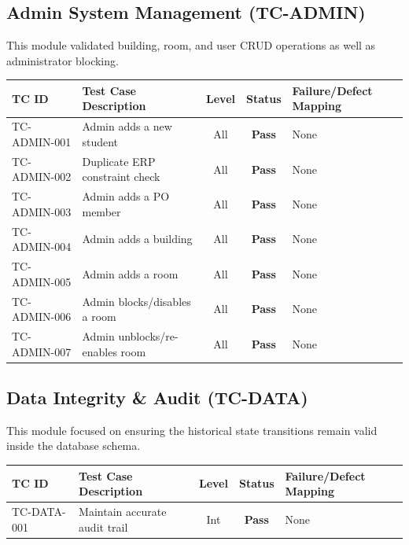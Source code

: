 \documentclass[11pt,a4paper]{article}
\begin{document}
\subsection{Admin System Management (TC-ADMIN)}
This module validated building, room, and user CRUD operations as well as administrator blocking.
\begin{center}
\begin{longtable}{llccp{5.5cm}}
\toprule
\textbf{TC ID} & \textbf{Test Case Description} & \textbf{Level} & \textbf{Status} & \textbf{Failure/Defect Mapping} \\ \midrule
TC-ADMIN-001 & Admin adds a new student & All & \color{passgreenfg}\textbf{Pass} & None \\
TC-ADMIN-002 & Duplicate ERP constraint check & All & \color{passgreenfg}\textbf{Pass} & None \\
TC-ADMIN-003 & Admin adds a PO member & All & \color{passgreenfg}\textbf{Pass} & None \\
TC-ADMIN-004 & Admin adds a building & All & \color{passgreenfg}\textbf{Pass} & None \\
TC-ADMIN-005 & Admin adds a room & All & \color{passgreenfg}\textbf{Pass} & None \\
TC-ADMIN-006 & Admin blocks/disables a room & All & \color{passgreenfg}\textbf{Pass} & None \\
TC-ADMIN-007 & Admin unblocks/re-enables room & All & \color{passgreenfg}\textbf{Pass} & None \\
\bottomrule
\end{longtable}
\end{center}

\subsection{Data Integrity \& Audit (TC-DATA)}
This module focused on ensuring the historical state transitions remain valid inside the database schema.
\begin{center}
\begin{longtable}{llccp{5.5cm}}
\toprule
\textbf{TC ID} & \textbf{Test Case Description} & \textbf{Level} & \textbf{Status} & \textbf{Failure/Defect Mapping} \\ \midrule
TC-DATA-001 & Maintain accurate audit trail & Int & \color{passgreenfg}\textbf{Pass} & None \\
\bottomrule
\end{longtable}
\end{center}
\end{document}
